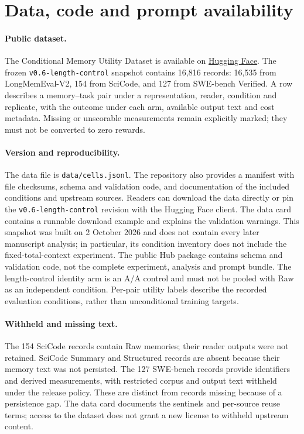 \section{Data, code and prompt availability}
\label{sec:repro}
\label{sec:prompts}
\paragraph{Public dataset.} The Conditional Memory Utility Dataset is available on
\href{https://huggingface.co/datasets/AgentsSci/AAMAS2027-ConditionalMemory}{Hugging Face}.
The frozen \texttt{v0.6-}\allowbreak\texttt{length-control} snapshot contains 16,816 records:
16,535 from LongMemEval-V2, 154 from SciCode, and 127 from SWE-bench Verified.
A row describes a memory--task pair under a representation, reader, condition
and replicate, with the outcome under each arm, available output text and
cost metadata. Missing or unscorable measurements remain explicitly marked;
they must not be converted to zero rewards.

\paragraph{Version and reproducibility.} The data file is
\texttt{data/}\allowbreak\texttt{cells.jsonl}. The repository also provides a manifest with file checksums, schema and validation
code, and documentation of the included conditions and upstream sources.
Readers can download the data directly or pin the
\texttt{v0.6-}\allowbreak\texttt{length-control} revision with the Hugging Face client. The data
card contains a runnable download example and explains the validation warnings.
This snapshot was built on 2 October 2026 and does not contain every later
manuscript analysis; in particular, its condition inventory does not include
the fixed-total-context experiment. The public Hub package contains schema and
validation code, not the complete experiment, analysis and prompt bundle.
The length-control identity arm is an A/A control and must not be pooled with
Raw as an independent condition. Per-pair utility labels describe the recorded
evaluation conditions, rather than unconditional training targets.

\paragraph{Withheld and missing text.} The 154 SciCode records contain Raw
memories; their reader outputs were not retained. SciCode Summary and Structured
records are absent because their memory text was not persisted. The 127
SWE-bench records provide identifiers and derived measurements, with restricted
corpus and output text withheld under the release policy. These are distinct
from records missing because of a persistence gap. The data card documents the
sentinels and per-source reuse terms; access to the dataset does not grant a
new license to withheld upstream content.
